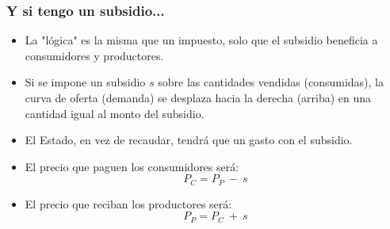 \documentclass{beamer}
\begin{document}
\begin{frame}
\begin{columns}
\begin{column}{0.49\textwidth}

\end{column}
\end{columns}
\end{frame}

\begin{frame}
\frametitle{Y si tengo un subsidio...}

\begin{itemize}
    \item La "lógica" es la misma que un impuesto, solo que el subsidio beneficia a consumidores y productores. \vspace{1mm}
    \item Si se impone un subsidio $s$ sobre las cantidades vendidas (consumidas), la curva de oferta (demanda) se desplaza hacia la derecha (arriba) en una cantidad igual al monto del subsidio.
    \vspace{1mm}
    \item El Estado, en vez de recaudar, tendrá que un gasto con el subsidio.
    \vspace{1mm}
    \item El precio que paguen los consumidores será:
          \[ P_C=P_P\ - \ s\] 
    \item El precio que reciban los productores será:
          \[ P_P=P_C\ + \ s\]       

\end{itemize}
\end{frame}

\end{document}
